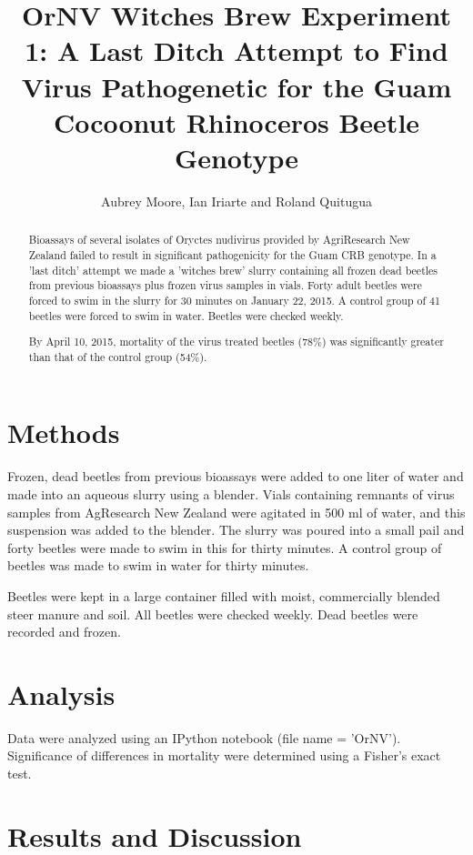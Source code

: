 \documentclass[letterpaper,11pt]{scrartcl}
\title{OrNV Witches Brew Experiment 1: A Last Ditch Attempt to Find Virus Pathogenetic for the Guam Cocoonut
Rhinoceros Beetle Genotype}
\author{Aubrey Moore, Ian Iriarte and Roland Quitugua}
\begin{document}
\maketitle

\begin{abstract}
Bioassays of several isolates of Oryctes nudivirus provided by AgriResearch New Zealand failed to result in 
significant pathogenicity for the Guam CRB genotype. In a 'last ditch' attempt we made a 'witches brew' slurry 
containing all frozen dead beetles from previous bioassays plus frozen virus samples in vials. Forty 
adult beetles were forced to swim in the slurry for 30 minutes on January 22, 2015. A control group of
41 beetles were forced to swim in water. Beetles were checked weekly.

By April 10, 2015, mortality of the virus treated beetles (78\%) was significantly greater than that of the
control group (54\%).
\end{abstract}

\section*{Methods}

Frozen, dead beetles from previous bioassays were added to one liter of water and made into an aqueous slurry
using a blender. Vials containing remnants of virus samples from AgResearch New Zealand were agitated in 500 ml of 
water, and this suspension was added to the blender. The slurry was poured into a small pail and
forty beetles were made to swim in this for thirty minutes. A control group of beetles was made to swim in water for 
thirty minutes.

Beetles were kept in a large container filled with moist, commercially blended steer manure and soil. 
All beetles were checked weekly. Dead beetles were recorded and frozen.

\section*{Analysis}

Data were analyzed using an IPython notebook (file name = 'OrNV'). Significance of differences in mortality
were determined using a Fisher's exact test.

\section*{Results and Discussion}
\end{document}
